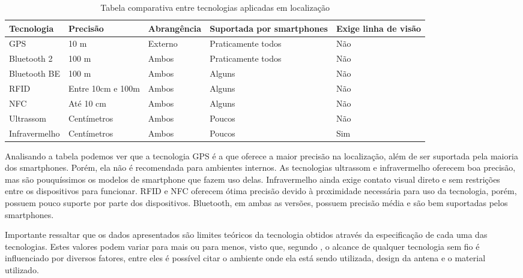 \documentclass[twoside,english,brazilian]{UNISINOSartigo}
\begin{document}
\begin{table}
	\caption{Tabela comparativa entre tecnologias aplicadas em localização}
	\label{tab:tecnologiasLocalizacao}
		\begin{tabular}{ p{} | p{2cm} | p{} | p{3cm} | p{3cm} }
			\hline
				Tecnologia & Precisão & Abrangência & Suportada por smartphones & Exige linha de visão   \\ \hline
				GPS & 10 m & Externo & Praticamente todos & Não   \\ \hline
				Bluetooth 2 & 100 m & Ambos & Praticamente todos & Não   \\ \hline
				Bluetooth BE & 100 m & Ambos & Alguns & Não   \\ \hline
				RFID & Entre 10cm e 100m & Ambos & Alguns & Não   \\ \hline
				NFC & Até 10 cm & Ambos & Alguns & Não   \\ \hline
				Ultrassom & Centímetros & Ambos & Poucos & Não   \\ \hline
				Infravermelho & Centímetros & Ambos & Poucos & Sim   \\ \hline
			\end{tabular}
\end{table}

Analisando a tabela podemos ver que a tecnologia GPS é a que oferece a maior precisão na localização, além de ser suportada pela maioria dos smartphones. Porém, ela não é recomendada para ambientes internos. As tecnologias ultrassom e infravermelho oferecem boa precisão, mas são pouquíssimos os modelos de smartphone que fazem uso delas. Infravermelho ainda exige contato visual direto e sem restrições entre os dispositivos para funcionar. RFID e NFC oferecem ótima precisão devido à proximidade necessária para uso da tecnologia, porém, possuem pouco suporte por parte dos dispositivos. Bluetooth, em ambas as versões, possuem precisão média e são bem suportadas pelos smartphones.

Importante ressaltar que os dados apresentados são limites teóricos da tecnologia obtidos através da especificação de cada uma das tecnologias. Estes valores podem variar para mais ou para menos, visto que, segundo , o alcance de qualquer tecnologia sem fio é influenciado por diversos fatores, entre eles é possível  citar o ambiente onde ela está sendo utilizada, design da antena e o material utilizado.
\end{document}
